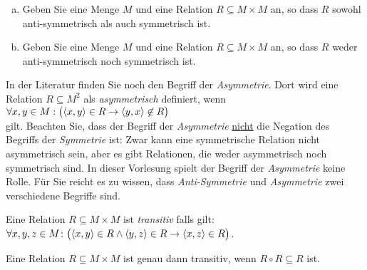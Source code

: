 \exercise
\begin{enumerate}[(a)]
\item Geben Sie eine Menge $M$ und eine Relation $R \subseteq M \times M$ an, so dass $R$
      sowohl anti-symmetrisch als auch symmetrisch ist.
\item Geben Sie eine Menge $M$ und eine Relation $R \subseteq M \times M$ an, so dass $R$
      weder anti-symmetrisch noch symmetrisch ist. \eox
\end{enumerate}
\pagebreak

\remark
In der Literatur finden Sie noch den Begriff der \emph{Asymmetrie}.  Dort wird eine Relation 
$R \subseteq M^2$ als \emph{asymmetrisch} definiert, wenn 
\\[0.2cm]
\hspace*{1.3cm}
$\forall x, y \in M: \bigl(\pair(x,y) \in R \rightarrow \pair(y,x) \not\in R \bigr)$
\\[0.2cm]
gilt.  Beachten Sie, dass der Begriff der \emph{Asymmetrie} \underline{nicht} die Negation des Begriffs der
\emph{Symmetrie} ist:  Zwar kann eine symmetrische Relation nicht asymmetrisch sein, aber es gibt
Relationen, die weder asymmetrisch noch symmetrisch sind.  In dieser Vorlesung spielt der Begriff
der \emph{Asymmetrie} keine Rolle.  F\"{u}r Sie reicht es zu wissen, dass \emph{Anti-Symmetrie} und
\emph{Asymmetrie} zwei verschiedene Begriffe sind.
\eox

\begin{Definition}[transitiv]
Eine Relation $R \subseteq M \times M$  ist \emph{transitiv} falls gilt: \\[0.2cm]
\hspace*{1.3cm} 
$\forall x, y, z \in M \colon \bigl(\pair(x,y) \in R \wedge \pair(y,z) \in R \rightarrow \pair(x,z) \in R\bigr)$. 
\eox
\end{Definition}

\begin{Satz}
Eine Relation $R \subseteq M \times M$  ist genau dann transitiv, wenn
$R \circ R \subseteq R$ ist.
\end{Satz}

